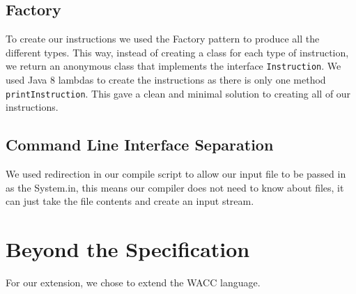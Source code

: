 \documentclass[11pt,a4paper]{article}
\begin{document}
\subsection{Factory}
\label{sub:Factory}
To create our instructions we used the Factory pattern to produce all the different types. This way, instead of creating a class for each type of instruction, we return an anonymous class that implements the interface \texttt{Instruction}. We used Java 8 lambdas to create the instructions as there is only one method \texttt{printInstruction}. This gave a clean and minimal solution to creating all of our instructions.

\subsection{Command Line Interface Separation}
\label{sub:Command Line Interface Seperation}
We used redirection in our compile script to allow our input file to be passed in as the System.in, this means our compiler does not need to know about files, it can just take the file contents and create an input stream.

\section{Beyond the Specification}
\label{sec:Beyond the Specification}
For our extension, we chose to extend the WACC language. 
\end{document}
